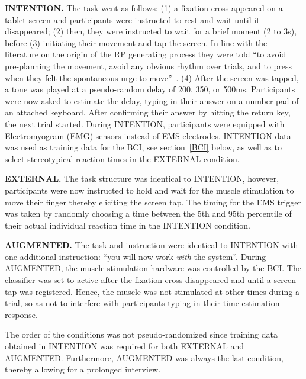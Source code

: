 \indent\textbf{INTENTION.} The task went as follows: (1) a fixation cross appeared on a tablet screen and participants were instructed to rest and wait until it disappeared; (2) then, they were instructed to wait for a brief moment (2 to 3s), before (3) initiating their movement and tap the screen. In line with the literature on the origin of the RP generating process they were told ``to avoid pre-planning the movement, avoid any obvious rhythm over trials, and to press when they felt the spontaneous urge to move''~\cite{Schultze-Kraft2021-cu}. (4) After the screen was tapped, a tone was played at a pseudo-random delay of 200, 350, or 500ms. Participants were now asked to estimate the delay, typing in their answer on a number pad of an attached keyboard. After confirming their answer by hitting the return key, the next trial started.
During INTENTION, participants were equipped with Electromyogram (EMG) sensors instead of EMS electrodes. INTENTION data was used as training data for the BCI, see section~\ref{BCI} below, as well as to select stereotypical reaction times in the EXTERNAL condition. 

\indent\textbf{EXTERNAL.} The task structure was identical to INTENTION, however, participants were now instructed to hold and wait for the muscle stimulation to move their finger thereby eliciting the screen tap. The timing for the EMS trigger was taken by randomly choosing a time between the 5th and 95th percentile of their actual individual reaction time in the INTENTION condition. 

\indent\textbf{AUGMENTED.} The task and instruction were identical to INTENTION with one additional instruction: ``you will now work \textit{with} the system''. During AUGMENTED, the muscle stimulation hardware was controlled by the BCI. The classifier was set to active after the fixation cross disappeared and until a screen tap was registered. Hence, the muscle was not stimulated at other times during a trial, so as not to interfere with participants typing in their time estimation response.

The order of the conditions was not pseudo-randomized since training data obtained in INTENTION was required for both EXTERNAL and AUGMENTED. Furthermore, AUGMENTED was always the last condition, thereby allowing for a prolonged interview.


